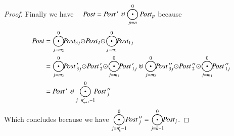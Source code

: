 \documentclass{elsarticle}
\newcommand{\shortodot}{\!\odot\!}
\begin{document}
\begin{proof}
Finally we have~~
$\Post=\displaystyle{\Post\,' \uplus \bigodot_{p=n}^0
		\Post_p}$\quad
because
{\small \begin{align*}
\Post&=\bigodot_{j=m_2}^{0}\!\!\Post_{3j}\shortodot\Post_2\shortodot\bigodot_{j=m_1}^{0}\!\!\Post_{1j}\\
&=\bigodot_{j=m_2}^{0}\!\!\Post\,'_{3j}\shortodot\Post\,'_2\shortodot\bigodot_{j=m_1}^{0}\!\!\Post\,'_{1j} \uplus \bigodot_{j=m_2}^{0}\!\!\Post\,''_{3j}\shortodot\Post\,''_2\shortodot\bigodot_{j=m_1}^{0}\!\!\Post\,''_{1j}\\
&=\Post\,' \uplus \bigodot_{j=n'_{n+1}-1}^{0}\!\!\Post\,''_{j}
\end{align*}}
Which concludes because  we have $\displaystyle{\bigodot_{j=n'_{k}-1}^{0}\!\!\Post\,''_{j} = \bigodot_{j=k-1}^{0}\!\!\Post_{j}}$.
%
%

\end{proof}
\end{document}
